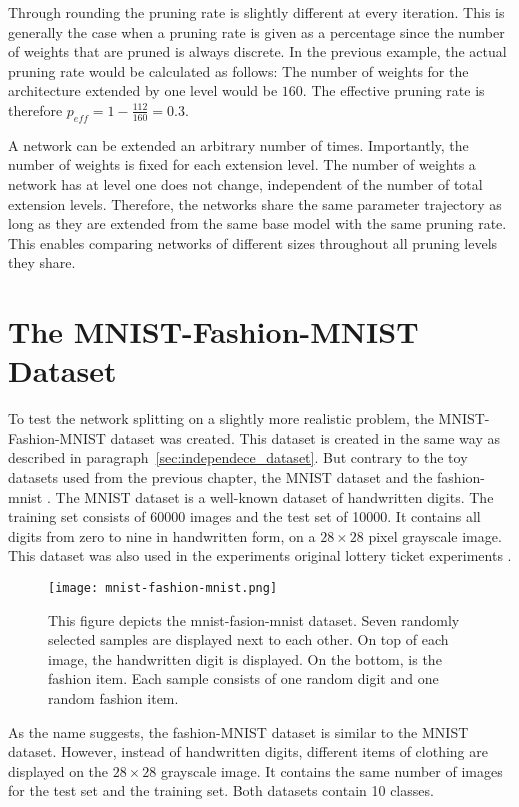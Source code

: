 Through rounding the pruning rate is slightly different at every iteration.
This is generally the case when a pruning rate is given as a percentage since the number of weights that are pruned is always discrete.
In the previous example, the actual pruning rate would be calculated as follows:
The number of weights for the architecture extended by one level would be $160$.
The effective pruning rate is therefore $p_{eff}=1-\frac{112}{160}=0.3$.

A network can be extended an arbitrary number of times.
Importantly, the number of weights is fixed for each extension level.
The number of weights a network has at level one does not change, independent of the number of total extension levels.
Therefore, the networks share the same parameter trajectory as long as they are extended from the same base model with the same pruning rate.
This enables comparing networks of different sizes throughout all pruning levels they share.

\section{The MNIST-Fashion-MNIST Dataset}\label{sec:mnist}
To test the network splitting on a slightly more realistic problem, the MNIST-Fashion-MNIST dataset was created.
This dataset is created in the same way as described in paragraph~\ref{sec:independece_dataset}.
But contrary to the toy datasets used from the previous chapter, the MNIST dataset \autocite{mnist} and the fashion-mnist \autocite{fashion}.
The MNIST dataset is a well-known dataset of handwritten digits. 
The training set consists of 60000 images and the test set of 10000.
It contains all digits from zero to nine in handwritten form, on a $28 \times 28$ pixel grayscale image.
This dataset was also used in the experiments original lottery ticket experiments \autocite{LTH}.

\begin{figure}[ht]
    \centering
    \texttt{[image: mnist-fashion-mnist.png]}
    \caption{
        This figure depicts the mnist-fasion-mnist dataset. 
        Seven randomly selected samples are displayed next to each other.
        On top of each image, the handwritten digit is displayed. 
        On the bottom, is the fashion item.
        Each sample consists of one random digit and one random fashion item.
    }\label{fig:mnist_fashion}
\end{figure}

As the name suggests, the fashion-MNIST dataset \autocite{fashion} is similar to the MNIST dataset.
However, instead of handwritten digits, different items of clothing are displayed on the $28 \times 28$ grayscale image.
It contains the same number of images for the test set and the training set.
Both datasets contain 10 classes.

